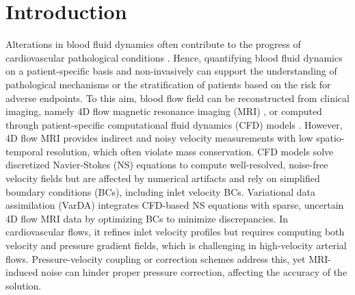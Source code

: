 \section*{Introduction}
Alterations in blood fluid dynamics often contribute to the progress of cardiovascular pathological conditions \citep{Bappoo2021,Guzzardi2015}. Hence, quantifying blood fluid dynamics on a patient-specific basis and non-invasively can support the understanding of pathological mechanisms or the stratification of patients based on the risk for adverse endpoints. To this aim, blood flow field can be reconstructed from clinical imaging, namely 4D flow magnetic resonance imaging (MRI) \citep{Dyverfeldt2015}, or computed through patient-specific computational fluid dynamics (CFD) models  \citep{Kheyfets2015}. 
However, 4D flow MRI provides indirect and noisy velocity measurements with low spatio-temporal resolution, which often violate mass conservation. CFD models solve discretized Navier-Stokes (NS) equations to compute well-resolved, noise-free velocity fields but are affected by numerical artifacts and rely on simplified boundary conditions (BCs), including inlet velocity BCs. Variational data assimilation (VarDA) integrates CFD-based NS equations with sparse, uncertain 4D flow MRI data by optimizing BCs to minimize discrepancies. In cardiovascular flows, it refines inlet velocity profiles but requires computing both velocity and pressure gradient fields, which is challenging in high-velocity arterial flows. Pressure-velocity coupling or correction schemes address this, yet MRI-induced noise can hinder proper pressure correction, affecting the accuracy of the solution.

